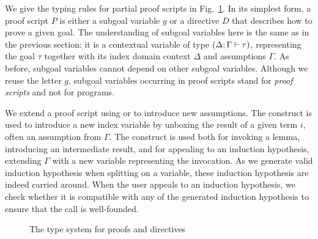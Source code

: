 %

\noindent
We give the typing rules for partial \Harpoon{} proof scripts in Fig.~\ref{fig:harpoon-types}.
In its simplest form, a proof script $P$ is either a subgoal variable $g$ or a
directive $D$ that describes how to prove a given goal.
The understanding of subgoal variables here is the same as in the previous
section: it is a contextual variable of type $(\Delta; \Gamma \vdash \tau)$,
representing the goal $\tau$ together with its index domain context $\Delta$
and assumptions $\Gamma$.
As before, subgoal variables cannot depend on other subgoal variables.
Although we reuse the letter $g$, subgoal variables occurring in proof scripts
stand for \emph{proof scripts} and not for programs.

We extend a proof script using \kwby{} or \kwunbox{} to introduce new
assumptions.
The \kwunbox{} construct is used to introduce a new index variable by unboxing
the result of a given \Beluga{} term $i$, often an assumption from $\Gamma$.
The \kwby{} construct is used both for invoking a lemma, introducing
an intermediate result, and for appealing to an
induction hypothesis, extending $\Gamma$ with a new variable representing the
invocation. As we generate valid induction hypothesis when splitting
on a variable, these induction hypothesis are indeed carried
around. When the user appeals to an induction hypothesis, we check
whether it is compatible with any of the generated induction
hypothesis to ensure that the call is well-founded.

\begin{figure}[h]
  \caption{%
    The type system for \Harpoon{} proofs and directives
  }
\label{fig:harpoon-types}
\end{figure}


%   


